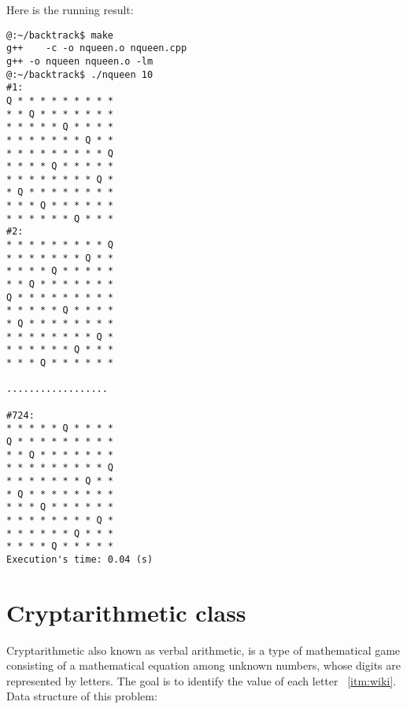 \documentclass[a4paper, 11pt]{article}
\begin{document}
\newpage
Here is the running result:

\begin{verbatim}
@:~/backtrack$ make
g++    -c -o nqueen.o nqueen.cpp
g++ -o nqueen nqueen.o -lm
@:~/backtrack$ ./nqueen 10
#1:
Q * * * * * * * * * 
* * Q * * * * * * * 
* * * * * Q * * * * 
* * * * * * * Q * * 
* * * * * * * * * Q 
* * * * Q * * * * * 
* * * * * * * * Q * 
* Q * * * * * * * * 
* * * Q * * * * * * 
* * * * * * Q * * * 
#2:
* * * * * * * * * Q 
* * * * * * * Q * * 
* * * * Q * * * * * 
* * Q * * * * * * * 
Q * * * * * * * * * 
* * * * * Q * * * * 
* Q * * * * * * * * 
* * * * * * * * Q * 
* * * * * * Q * * * 
* * * Q * * * * * * 

..................

#724:
* * * * * Q * * * * 
Q * * * * * * * * * 
* * Q * * * * * * * 
* * * * * * * * * Q 
* * * * * * * Q * * 
* Q * * * * * * * * 
* * * Q * * * * * * 
* * * * * * * * Q * 
* * * * * * Q * * * 
* * * * Q * * * * * 
Execution's time: 0.04 (s)
\end{verbatim}

\newpage
\section{Cryptarithmetic class}
Cryptarithmetic also known as verbal arithmetic, is a type of mathematical game consisting of a mathematical equation among unknown numbers, whose digits are represented by letters. The goal is to identify the value of each letter ~\ref{itm:wiki}. Data structure of this problem:

\end{document}

